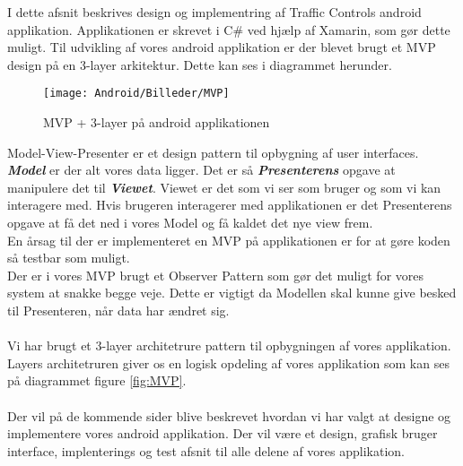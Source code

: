 	I dette afsnit beskrives design og implementring af Traffic Controls android applikation. 
	Applikationen er skrevet i C\# ved hjælp af Xamarin, som gør dette muligt.
	Til udvikling af vores android applikation er der blevet brugt et MVP design på en 3-layer arkitektur. Dette kan ses i diagrammet herunder.
	
	\begin{figure} [!ht]
		\begin{center}
			\texttt{[image: Android/Billeder/MVP]}
		\end{center}
		\caption{MVP + 3-layer på android applikationen}
		\label{fig:MVP}
	\end{figure}
	\pagebreak
	\noindent Model-View-Presenter er et design pattern til opbygning af user interfaces. \textbf{\emph{Model}} er der alt vores data ligger. Det er så \textbf{\emph{Presenterens}} opgave at manipulere det til \textbf{\emph{Viewet}}. Viewet er det som vi ser som bruger og som vi kan interagere med. Hvis brugeren interagerer med applikationen er det Presenterens opgave at få det ned i vores Model og få kaldet det nye view frem. \\
	En årsag til der er implementeret en MVP på applikationen er for at gøre koden så testbar som muligt. \\
	Der er i vores MVP brugt et Observer Pattern som gør det muligt for vores system at snakke begge veje. Dette er vigtigt da Modellen skal kunne give besked til Presenteren, når data har ændret sig.
	\\
	\\
	Vi har brugt et 3-layer architetrure pattern til opbygningen af vores applikation. Layers architetruren giver os en logisk opdeling af vores applikation som kan ses på diagrammet figure \vref{fig:MVP}.
	\\
	\\
	Der vil på de kommende sider blive beskrevet hvordan vi har valgt at designe og implementere vores android applikation. Der vil være et design, grafisk bruger interface, implenterings og test afsnit til alle delene af vores applikation.
	\pagebreak